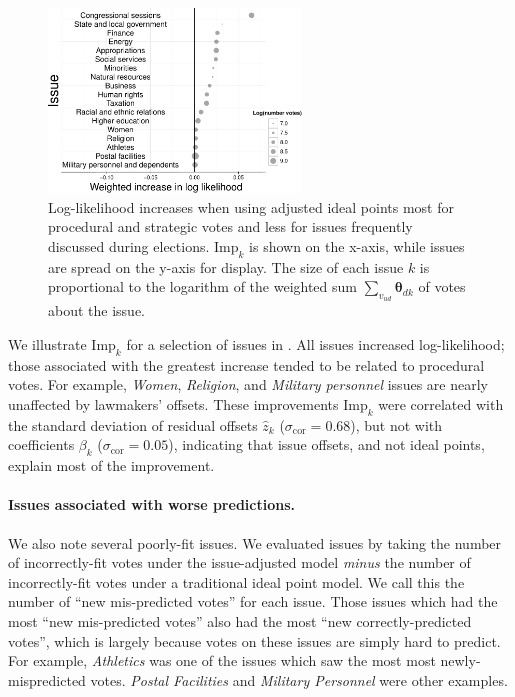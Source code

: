 \begin{figure}
  \center
  \includegraphics[width=0.6\textwidth]{chapter_spatial_voting_with_text/figures/3393_interesting_offsets.pdf}
  \caption{Log-likelihood increases when using adjusted ideal points
  most for procedural and strategic votes and less for issues
  frequently discussed during elections.  $\mbox{Imp}_k$ is shown on
  the x-axis, while issues are spread on the y-axis for display.
  The size of each issue $k$ is proportional to the logarithm of the
  weighted sum $\sum_{v_{ud}} \bm \theta_{dk}$ of votes about the
  issue.}
  \label{fig:issue_improvements}
\end{figure}
We illustrate $\mbox{Imp}_k$ for a selection of issues in
.  All issues increased
log-likelihood; those associated with the greatest increase tended to
be related to procedural votes.  For example, \emph{Women},
\emph{Religion}, and \emph{Military personnel} issues are nearly
unaffected by lawmakers' offsets.  These improvements $\mbox{Imp}_k$
were correlated with the standard deviation of residual offsets $\hat
z_k$ ($\sigma_{\mbox{cor}}=0.68$), but not with coefficients $\beta_k$
($\sigma_{\mbox{cor}}=0.05$), indicating that issue offsets, and not
ideal points, explain most of the improvement.

\paragraph{Issues associated with worse predictions.}
We also note several poorly-fit issues.  We evaluated issues by taking
the number of incorrectly-fit votes under the issue-adjusted model
\emph{minus} the number of incorrectly-fit votes under a traditional ideal
point model.  We call this the number of ``new mis-predicted votes''
for each issue.  Those issues which had the most ``new mis-predicted
votes'' also had the most ``new correctly-predicted votes'', which is
largely because votes on these issues are simply hard to predict.  For
example, \emph{Athletics} was one of the issues which saw the most
most newly-mispredicted votes.  \emph{Postal Facilities} and
\emph{Military Personnel} were other examples.


